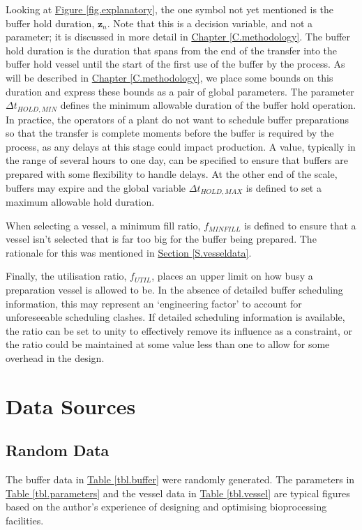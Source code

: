 Looking at \hyperref[fig.explanatory]{Figure \ref*{fig.explanatory}}, the one
symbol not yet mentioned is the buffer hold duration, $\boldsymbol{z}_{n}$.
Note that this is a decision variable, and not a parameter; it is discussed in
more detail in \hyperref[C.methodology]{Chapter \ref*{C.methodology}}.
The buffer hold duration is the duration that spans from the end of the
transfer into the buffer hold vessel until the start of the first use of the
buffer by the process.
As will be described in 
\hyperref[C.methodology]{Chapter \ref*{C.methodology}},
we place some bounds on this duration and express these bounds as a pair of
global parameters.
The parameter $\Delta t_{\mathit{HOLD,MIN}}$ defines the minimum allowable
duration of the buffer hold operation.
In practice, the operators of a plant do not want to schedule buffer
preparations so that the transfer is complete moments before the buffer is
required by the process, as any delays at this stage could impact production.
A value, typically in the range of several hours to one day, can be specified
to ensure that buffers are prepared with some flexibility to handle delays.
At the other end of the scale, buffers may expire and the global variable 
$\Delta t_{\mathit{HOLD,MAX}}$ is defined to set a maximum allowable hold
duration.

When selecting a vessel, a minimum fill ratio, $f_{\mathit{MINFILL}}$ is
defined to ensure that a vessel isn't selected that is far too big for the
buffer being prepared. The rationale for this was mentioned in
\hyperref[S.vesseldata]{Section \ref*{S.vesseldata}}.

Finally, the utilisation ratio, $f_{\mathit{UTIL}}$, places an upper limit on
how busy a preparation vessel is allowed to be.
In the absence of detailed buffer scheduling information, this may represent an
`engineering factor' to account for unforeseeable scheduling clashes.
If detailed scheduling information is available, the ratio can be set to unity
to effectively remove its influence as a constraint, or the ratio could be
maintained at some value less than one to allow for some overhead in the
design.

\section{Data Sources}\label{S.sources}

\subsection{Random Data}\label{SS.randomdata}
The buffer data in \hyperref[tbl.buffer]{Table \ref*{tbl.buffer}} were randomly
generated.  
The parameters in \hyperref[tbl.parameters]{Table \ref*{tbl.parameters}} and
the vessel data in \hyperref[tbl.vessel]{Table \ref*{tbl.vessel}} are typical
figures based on the author's experience of designing and optimising
bioprocessing facilities.


